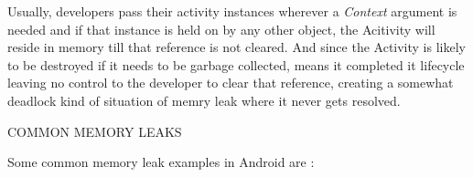 \documentclass[journal]{IEEEtran}
\begin{document}
Usually, developers pass their activity instances wherever a \emph{Context} argument is needed and if that instance is held on by any other object, the Acitivity will reside in memory till that reference is not cleared. And since the Activity is likely to be destroyed if it needs to be garbage collected, means it completed it lifecycle leaving no control to the developer to clear that reference, creating a somewhat deadlock kind of situation of memry leak where it never gets resolved.\\

\begin{center}
	COMMON MEMORY LEAKS
\end{center}

Some common memory leak examples in Android are :\\
\end{document}
